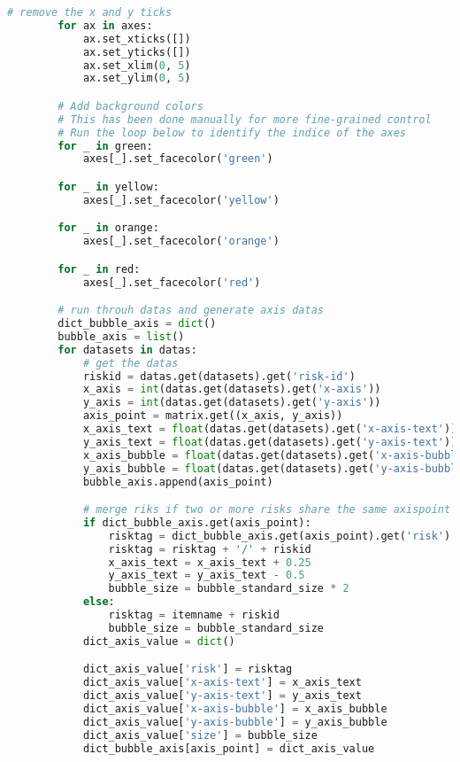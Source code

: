 \begin{lstlisting}[language=python, caption=Python LaTex - riskmatrix.py - Risxikomatrizen,captionpos=b,label={lst:riskmatrix},breaklines=true]
        # remove the x and y ticks
        for ax in axes:
            ax.set_xticks([])
            ax.set_yticks([])
            ax.set_xlim(0, 5)
            ax.set_ylim(0, 5)

        # Add background colors
        # This has been done manually for more fine-grained control
        # Run the loop below to identify the indice of the axes
        for _ in green:
            axes[_].set_facecolor('green')

        for _ in yellow:
            axes[_].set_facecolor('yellow')

        for _ in orange:
            axes[_].set_facecolor('orange')

        for _ in red:
            axes[_].set_facecolor('red')

        # run throuh datas and generate axis datas
        dict_bubble_axis = dict()
        bubble_axis = list()
        for datasets in datas:
            # get the datas
            riskid = datas.get(datasets).get('risk-id')
            x_axis = int(datas.get(datasets).get('x-axis'))
            y_axis = int(datas.get(datasets).get('y-axis'))
            axis_point = matrix.get((x_axis, y_axis))
            x_axis_text = float(datas.get(datasets).get('x-axis-text'))
            y_axis_text = float(datas.get(datasets).get('y-axis-text'))
            x_axis_bubble = float(datas.get(datasets).get('x-axis-bubble'))
            y_axis_bubble = float(datas.get(datasets).get('y-axis-bubble'))
            bubble_axis.append(axis_point)

            # merge riks if two or more risks share the same axispoint
            if dict_bubble_axis.get(axis_point):
                risktag = dict_bubble_axis.get(axis_point).get('risk')
                risktag = risktag + '/' + riskid
                x_axis_text = x_axis_text + 0.25
                y_axis_text = y_axis_text - 0.5
                bubble_size = bubble_standard_size * 2
            else:
                risktag = itemname + riskid
                bubble_size = bubble_standard_size
            dict_axis_value = dict()

            dict_axis_value['risk'] = risktag
            dict_axis_value['x-axis-text'] = x_axis_text
            dict_axis_value['y-axis-text'] = y_axis_text
            dict_axis_value['x-axis-bubble'] = x_axis_bubble
            dict_axis_value['y-axis-bubble'] = y_axis_bubble
            dict_axis_value['size'] = bubble_size
            dict_bubble_axis[axis_point] = dict_axis_value


\end{lstlisting}
